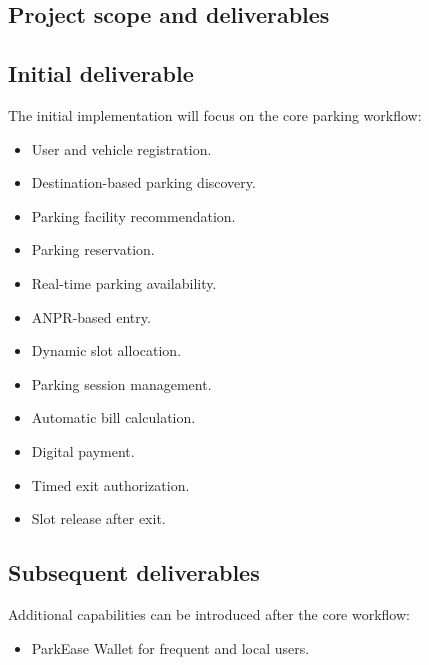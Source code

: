 \documentclass[12pt,a4paper]{article}
\begin{document}
\begin{enumerate}
\section{Project scope and deliverables}

\subsection{Initial deliverable}

The initial implementation will focus on the core parking workflow:

\begin{itemize}
    \item User and vehicle registration.

    \item Destination-based parking discovery.

    \item Parking facility recommendation.

    \item Parking reservation.

    \item Real-time parking availability.

    \item ANPR-based entry.

    \item Dynamic slot allocation.

    \item Parking session management.

    \item Automatic bill calculation.

    \item Digital payment.

    \item Timed exit authorization.

    \item Slot release after exit.
\end{itemize}

\subsection{Subsequent deliverables}

Additional capabilities can be introduced after the core workflow:

\begin{itemize}
    \item ParkEase Wallet for frequent and local users.


\end{itemize}
\end{enumerate}
\end{document}
